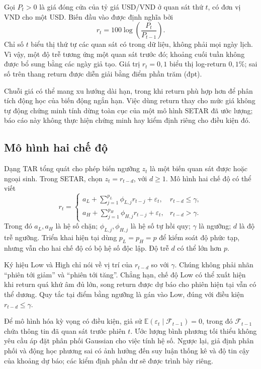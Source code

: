 \documentclass[a4paper,reqno,oneside]{book}
\numberwithin{equation}{chapter}
\begin{document}
Gọi $P_t>0$ là giá đóng cửa của tỷ giá USD/VND ở quan sát thứ $t$, có đơn vị VND cho một USD. Biến đầu vào được định nghĩa bởi
\begin{equation}
  r_t=100\log\!\left(\frac{P_t}{P_{t-1}}\right).
  \label{eq:setar-return}
\end{equation}
Chỉ số $t$ biểu thị thứ tự các quan sát có trong dữ liệu, không phải mọi ngày lịch. Vì vậy, một độ trễ tương ứng một quan sát trước đó; khoảng cuối tuần không được bổ sung bằng các ngày giả tạo. Giá trị $r_t=0{,}1$ biểu thị log-return $0{,}1\%$; sai số trên thang return được diễn giải bằng điểm phần trăm (đpt).

Chuỗi giá có thể mang xu hướng dài hạn, trong khi return phù hợp hơn để phân tích động học của biến động ngắn hạn. Việc dùng return thay cho mức giá không tự động chứng minh tính dừng toàn cục của một mô hình SETAR đã ước lượng; báo cáo này không thực hiện chứng minh hay kiểm định riêng cho điều kiện đó.

\subsection{Mô hình hai chế độ}

Dạng TAR tổng quát cho phép biến ngưỡng $z_t$ là một biến quan sát được hoặc ngoại sinh. Trong SETAR, chọn $z_t=r_{t-d}$, với $d\geq1$. Mô hình hai chế độ có thể viết
\begin{equation}
 r_t=
 \begin{cases}
 a_L+\displaystyle\sum_{j=1}^{p_L}\phi_{L,j}r_{t-j}+\varepsilon_t,
       & r_{t-d}\leq\gamma,\\[3pt]
 a_H+\displaystyle\sum_{j=1}^{p_H}\phi_{H,j}r_{t-j}+\varepsilon_t,
       & r_{t-d}>\gamma.
 \end{cases}
 \label{eq:setar-general}
\end{equation}
Trong đó $a_L,a_H$ là hệ số chặn; $\phi_{L,j},\phi_{H,j}$ là hệ số tự hồi quy; $\gamma$ là ngưỡng; $d$ là độ trễ ngưỡng. Triển khai hiện tại dùng $p_L=p_H=p$ để kiểm soát độ phức tạp, nhưng vẫn cho hai chế độ có bộ hệ số độc lập. Độ trễ $d$ có thể lớn hơn $p$.

Ký hiệu Low và High chỉ nói về vị trí của $r_{t-d}$ so với $\gamma$. Chúng không phải nhãn ``phiên tới giảm'' và ``phiên tới tăng''. Chẳng hạn, chế độ Low có thể xuất hiện khi return quá khứ âm đủ lớn, song return được dự báo cho phiên hiện tại vẫn có thể dương. Quy tắc tại điểm bằng ngưỡng là gán vào Low, đúng với điều kiện $r_{t-d}\leq\gamma$.

Để mô hình hóa kỳ vọng có điều kiện, giả sử $\mathbb{E}(\varepsilon_t\mid\mathcal F_{t-1})=0$, trong đó $\mathcal F_{t-1}$ chứa thông tin đã quan sát trước phiên $t$. Ước lượng bình phương tối thiểu không yêu cầu áp đặt phân phối Gaussian cho việc tính hệ số. Ngược lại, giả định phân phối và động học phương sai có ảnh hưởng đến suy luận thống kê và độ tin cậy của khoảng dự báo; các kiểm định phần dư sẽ được trình bày riêng.
\end{document}

